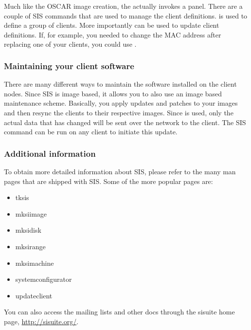 Much like the OSCAR image creation, the  actually
invokes a  panel. There are a couple of SIS commands that are used 
to manage the client definitions.  is used to define a group of
clients. More importantly  can be used to update client 
definitions. If, for example, you needed to change the MAC address after replacing
one of your clients, you could use .

\subsubsection{Maintaining your client software}

There are many different ways to maintain the software installed on the client
nodes. Since SIS is image based, it allows you to also use an image based 
maintenance scheme. Basically, you apply updates and patches to your images 
and then resync the clients to their respective images. Since  is
used, only the actual data that has changed will be sent over the network to 
the client. The SIS command  can be run on any client to
initiate this update.

\subsubsection{Additional information}

To obtain more detailed information about SIS, please refer to the many man
pages that are shipped with SIS. Some of the more popular pages are:

\begin{itemize}
\item tksis
\item mksiimage
\item mksidisk
\item mksirange
\item mksimachine
\item systemconfigurator
\item updateclient
\end{itemize}

You can also access the mailing lists and other docs through the sisuite
home page, \url{http://sisuite.org/}.
